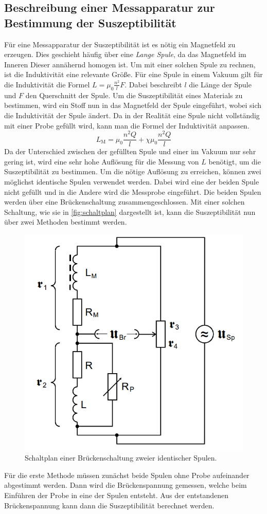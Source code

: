 \subsection{Beschreibung einer Messapparatur zur Bestimmung der Suszeptibilität}
\label{subsec:Messapparatur}
Für eine Messapparatur der Suszeptibilität ist es nötig ein Magnetfeld zu erzeugen. Dies geschieht häufig über eine \textit{Lange Spule}, da das Magnetfeld im Inneren Dieser
annähernd homogen ist. Um mit einer solchen Spule zu rechnen, ist die Induktivität eine relevante Größe.
Für eine Spule in einem Vakuum gilt für die Induktivität die Formel $L = \mu_0 \frac{n^2}{l}F$. Dabei beschreibt $l$ die Länge der Spule und $F$ den Querschnitt der Spule.
Um die Suszeptibilität eines Materials zu bestimmen, wird ein Stoff nun in das Magnetfeld der Spule eingeführt, wobei sich die Induktivität der Spule ändert. 
Da in der Realität eine Spule nicht vollständig mit einer Probe gefüllt wird, kann man die Formel der Induktivität anpassen.
\begin{equation}
    \label{eqn:L_M}
    L_{\text{M}} = \mu_0 \frac{n^2 Q}{l} + \chi \mu_0 \frac{n^2 Q}{l}
\end{equation} 
Da der Unterschied zwischen der gefüllten Spule und einer im Vakuum nur sehr gering ist, wird eine sehr hohe Auflösung für die Messung von $L$ benötigt,
um die Suszeptibilität zu bestimmen. Um die nötige Auflösung zu erreichen, können zwei möglichst identische Spulen verwendet werden. Dabei wird eine der beiden Spule nicht 
gefüllt und in die Andere wird die Messprobe eingeführt. Die beiden Spulen werden über eine Brückenschaltung zusammengeschlossen. Mit einer solchen Schaltung, wie sie in
\autoref{fig:schaltplan} dargestellt ist, kann die Suszeptibilität nun über zwei Methoden bestimmt werden.
\begin{figure}
    \centering
    \includegraphics[width = .5\textwidth]{content/Schaltung1.PNG}
    \caption{Schaltplan einer Brückenschaltung zweier identischer Spulen. \cite{v606}}
    \label{fig:schaltplan}
\end{figure} 
Für die erste Methode müssen zunächst beide Spulen ohne Probe aufeinander abgestimmt werden. Dann wird die Brückenspannung gemessen, welche beim Einführen der Probe in eine der 
Spulen entsteht. Aus der entstandenen Brückenspannung kann dann die Suszeptibilität berechnet werden.

